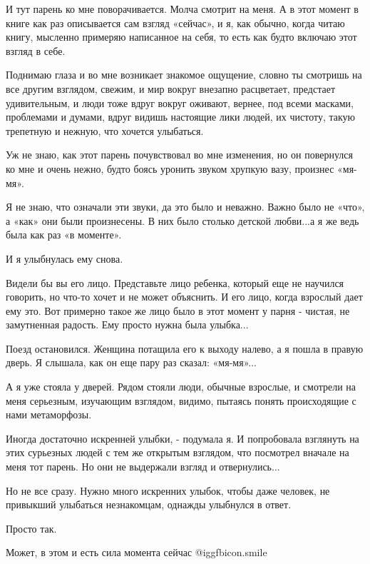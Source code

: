 И тут парень ко мне поворачивается. Молча смотрит на меня. А в этот момент в
книге как раз описывается сам взгляд «сейчас», и я, как обычно, когда читаю
книгу, мысленно примеряю написанное на себя, то есть как будто включаю этот
взгляд в себе. 

Поднимаю глаза и во мне возникает знакомое ощущение, словно ты смотришь на все
другим взглядом, свежим, и мир вокруг внезапно расцветает, предстает
удивительным, и люди тоже вдруг вокруг оживают, вернее, под всеми масками,
проблемами и думами, вдруг видишь настоящие лики людей, их чистоту, такую
трепетную и нежную, что хочется улыбаться. 

Уж не знаю, как этот парень почувствовал во мне изменения, но он повернулся ко
мне и очень нежно, будто боясь уронить звуком хрупкую вазу, произнес «мя-мя». 

Я не знаю, что означали эти звуки, да это было и неважно. Важно было не «что»,
а «как» они были произнесены. В них было столько детской любви...а я же ведь
была как раз «в моменте».

И я улыбнулась ему снова. 

Видели бы вы его лицо. Представьте лицо ребенка, который еще не научился
говорить, но что-то хочет и не может объяснить. И его лицо, когда взрослый дает
ему это. Вот примерно такое же лицо было в этот момент у парня - чистая, не
замутненная радость. Ему просто нужна была улыбка...

Поезд остановился. Женщина потащила его к выходу налево, а я пошла в правую
дверь. Я слышала, как он еще пару раз сказал: «мя-мя»...

А я уже стояла у дверей. Рядом стояли люди, обычные взрослые, и смотрели на
меня серьезным, изучающим взглядом, видимо, пытаясь понять происходящие с нами
метаморфозы. 

Иногда достаточно искренней улыбки, - подумала я. И попробовала взглянуть на
этих сурьезных людей с тем же открытым взглядом, что посмотрел вначале на меня
тот парень. Но они не выдержали взгляд и отвернулись...

Но не все сразу. Нужно много искренних улыбок, чтобы даже человек, не привыкший
улыбаться незнакомцам, однажды улыбнулся в ответ. 

Просто так. 

Может, в этом и есть сила момента сейчас  @igg{fbicon.smile} 
